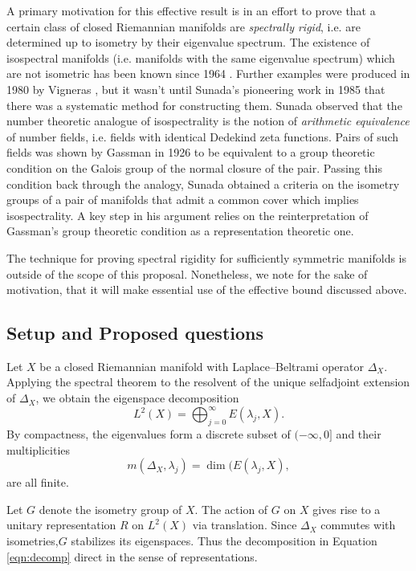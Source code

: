 \documentclass[11pt]{article}
\begin{document}
A primary motivation for this effective result is in an effort to prove that a certain class of closed Riemannian manifolds are \emph{spectrally rigid}, i.e. are determined up to isometry by their eigenvalue spectrum. The existence of isospectral manifolds (i.e. manifolds with the same eigenvalue spectrum) which are not isometric has been known since 1964 \cite{milnor1964}. Further examples were produced in 1980 by Vigneras \cite{vigneras1980}, but it wasn't until Sunada's pioneering work in 1985 \cite{Sunada1985} that there was a systematic method for constructing them. Sunada observed that the number theoretic analogue of isospectrality is the notion of \emph{arithmetic equivalence} of number fields, i.e. fields with identical Dedekind zeta functions. Pairs of such fields was shown by Gassman \cite{gassmann1926} in 1926 to be  equivalent to a group theoretic condition on the Galois group of the normal closure of the pair. Passing this condition back through the analogy, Sunada obtained a criteria on the isometry groups of a pair of manifolds that admit a common cover which implies isospectrality. A key step in his argument relies on the reinterpretation of Gassman's group theoretic condition as a representation theoretic one.  

The technique for proving spectral rigidity for sufficiently symmetric manifolds is outside of the scope of this proposal. Nonetheless, we note for the sake of motivation, that it will make essential use of the effective bound discussed above. 
\\
\subsection{Setup and Proposed questions}

Let $X$ be a closed Riemannian manifold with Laplace--Beltrami operator $\Delta_X$. Applying the spectral theorem to the resolvent of the unique selfadjoint extension of $\Delta_X$, we obtain the eigenspace decomposition
\begin{equation}L^2(X) = \bigoplus_{j=0}^\infty E(\lambda_j,X). \label{eqn:decomp} \end{equation}
By compactness, the eigenvalues form a discrete subset of $(-\infty,0]$ and their multiplicities  
\[ m(\Delta_X,\lambda_j)=\dim (E(\lambda_j,X),\] are all finite.

Let $G$ denote the isometry group of $X$.  The action of $G$ on $X$ gives rise to a unitary representation $R$ on $L^2(X)$ via translation. Since $\Delta_X$ commutes with isometries,$G$ stabilizes its eigenspaces. Thus the decomposition in Equation \ref{eqn:decomp} direct in the sense of representations.     
\end{document}

